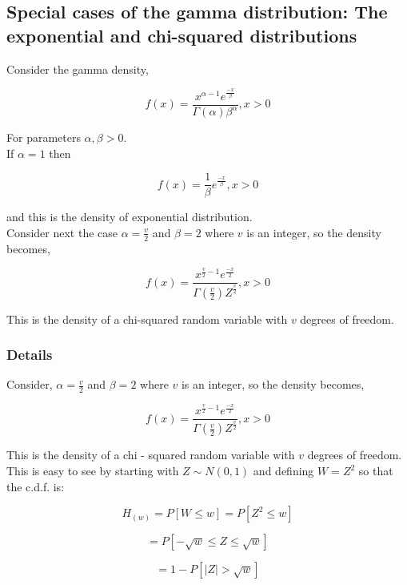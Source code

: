 \documentclass[12pt,a4paper]{article}
\theoremstyle{regla}
\theoremstyle{remark}
\theoremstyle{definition}
\theoremstyle{nonumberbreak}
\begin{document}
\subsection{Special cases of the gamma distribution: The exponential and chi-squared distributions}
\begin{fbox}
\begin{minipage}{0.97\textwidth}
Consider the gamma density,


$$ f(x) = \frac {x^{\alpha - 1} e^\frac{-x}{\beta}} {\Gamma(\alpha) \beta^{\alpha}} , x > 0$$

For parameters $\alpha, \beta > 0 $.\\

If $\alpha = 1 $ then

$$f(x) = \frac {1} {\beta} e^\frac{-x}{\beta}, x > 0$$

and this is the density of exponential distribution.\\

Consider next the case $ \alpha = \frac{v}{2}$ and $ \beta = 2$ where $v$ is an integer, so the density becomes,

 $$ f(x) = \frac {x^ {\frac{v}{2}- 1} e^\frac{-x}{2}} {\Gamma (\frac{v}{2}) Z^ \frac{v}{2}},  x > 0$$
 
This is the density of a chi-squared random variable with $v$ degrees of freedom.

\end{minipage}
\end{fbox}
\subsubsection{Details}
Consider, $ \alpha = \frac{v}{2}$ and $ \beta = 2$ where $v$ is an integer, so the density becomes,

 $$ f(x) = \frac {x^ {\frac{v}{2}- 1} e^\frac{-x}{2}} {\Gamma (\frac{v}{2}) Z^ \frac{v}{2}},  x > 0$$
 
This is the density of a chi - squared random variable with $v$ degrees of freedom.\\

This is easy to see by starting with $ Z \sim N(0,1)$ and defining $ W = Z^2$ so that the c.d.f. is:
 
$$H _{(w)} = P [W \leq w] = P [ Z^2 \leq w]$$

$$ = P [ - \sqrt{w}\leq Z \leq \sqrt{w}]$$

$$ = 1 - P [|Z| > \sqrt{w}]$$
 
\end{document}
